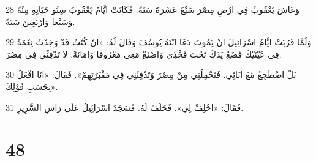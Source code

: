 \par 28 وَعَاشَ يَعْقُوبُ فِي ارْضِ مِصْرَ سَبْعَ عَشَرَةَ سَنَةً. فَكَانَتْ ايَّامُ يَعْقُوبَ سِنُو حَيَاتِهِ مِئَةً وَسَبْعا وَارْبَعِينَ سَنَةً.
\par 29 وَلَمَّا قَرُبَتْ ايَّامُ اسْرَائِيلَ انْ يَمُوتَ دَعَا ابْنَهُ يُوسُفَ وَقَالَ لَهُ: «انْ كُنْتُ قَدْ وَجَدْتُ نِعْمَةً فِي عَيْنَيْكَ فَضَعْ يَدَكَ تَحْتَ فَخْذِي وَاصْنَعْ مَعِي مَعْرُوفا وَامَانَةً. لا تَدْفِنِّي فِي مِصْرَ.
\par 30 بَلْ اضْطَجِعُ مَعَ ابَائِي. فَتَحْمِلُنِي مِنْ مِصْرَ وَتَدْفِنُنِي فِي مَقْبَرَتِهِمْ». فَقَالَ: «انَا افْعَلُ بِحَسَبِ قَوْلِكَ».
\par 31 فَقَالَ: «احْلِفْ لِي». فَحَلَفَ لَهُ. فَسَجَدَ اسْرَائِيلُ عَلَى رَاسِ السَّرِيرِ.

\chapter{48}

